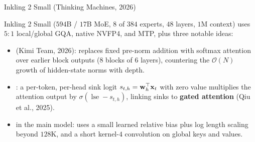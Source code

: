 \documentclass[11pt,aspectratio=169]{beamer}
\begin{document}
\begin{frame}{Inkling 2 Small (Thinking Machines, 2026)}
    \setlength{\parskip}{4pt}

    Inkling 2 Small ($594$B / $17$B MoE, $8$ of $384$ experts, $48$ layers,
    $1$M context) uses $5{:}1$ local/global GQA, native NVFP4, and MTP, plus
    three notable ideas:
    \begin{itemize}
        \setlength{\itemsep}{3pt}
        \item {} (Kimi Team, 2026): replaces fixed
              pre-norm addition with softmax attention over earlier block
              outputs ($8$ blocks of $6$ layers), countering the $\mathcal{O}(N)$
              growth of hidden-state norms with depth.
        \item {}: a per-token,
              per-head sink logit $s_{t,h}=\boldsymbol{\mathbf{w}}_h^{\top}\boldsymbol{\mathbf{x}}_t$ with zero
              value multiplies the attention output by
              $\sigma(\operatorname{lse}-s_{t,h})$, linking sinks to
              \textbf{gated attention} (Qiu et al., 2025).
        \item {} in the main model: uses a small learned
              relative bias plus log length scaling beyond $128$K, and a short
              kernel-$4$ convolution on global keys and values.
    \end{itemize}


\end{frame}
\end{document}
